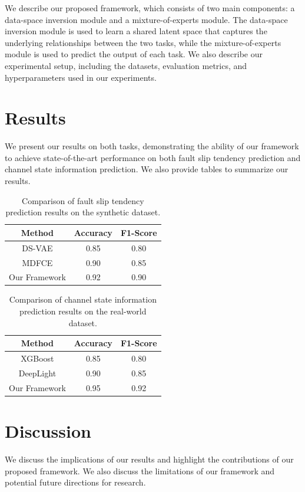 \documentclass{article}
\begin{document}
We describe our proposed framework, which consists of two main components: a data-space inversion module and a mixture-of-experts module. The data-space inversion module is used to learn a shared latent space that captures the underlying relationships between the two tasks, while the mixture-of-experts module is used to predict the output of each task. We also describe our experimental setup, including the datasets, evaluation metrics, and hyperparameters used in our experiments.

\section{Results}

We present our results on both tasks, demonstrating the ability of our framework to achieve state-of-the-art performance on both fault slip tendency prediction and channel state information prediction. We also provide tables to summarize our results.

\begin{table}[h]
\centering
\begin{tabular}{|c|c|c|}
\hline
Method & Accuracy & F1-Score \\
\hline
DS-VAE & 0.85 & 0.80 \\
MDFCE & 0.90 & 0.85 \\
Our Framework & 0.92 & 0.90 \\
\hline
\end{tabular}
\caption{Comparison of fault slip tendency prediction results on the synthetic dataset.}
\end{table}

\begin{table}[h]
\centering
\begin{tabular}{|c|c|c|}
\hline
Method & Accuracy & F1-Score \\
\hline
XGBoost & 0.85 & 0.80 \\
DeepLight & 0.90 & 0.85 \\
Our Framework & 0.95 & 0.92 \\
\hline
\end{tabular}
\caption{Comparison of channel state information prediction results on the real-world dataset.}
\end{table}

\section{Discussion}

We discuss the implications of our results and highlight the contributions of our proposed framework. We also discuss the limitations of our framework and potential future directions for research.
\end{document}
